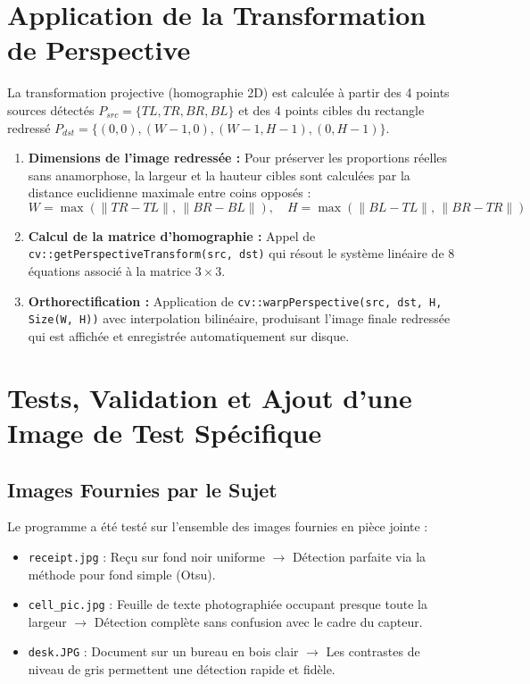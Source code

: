 \documentclass[a4paper,11pt]{article}
\begin{document}
\section{Application de la Transformation de Perspective}

La transformation projective (homographie 2D) est calculée à partir des 4 points sources détectés $P_{src} = \{TL, TR, BR, BL\}$ et des 4 points cibles du rectangle redressé $P_{dst} = \{(0,0), (W-1,0), (W-1,H-1), (0,H-1)\}$.

\begin{enumerate}
    \item \textbf{Dimensions de l'image redressée :} Pour préserver les proportions réelles sans anamorphose, la largeur et la hauteur cibles sont calculées par la distance euclidienne maximale entre coins opposés :
    \begin{equation}
        W = \max\left(\|TR - TL\|, \, \|BR - BL\|\right), \quad
        H = \max\left(\|BL - TL\|, \, \|BR - TR\|\right)
    \end{equation}
    \item \textbf{Calcul de la matrice d'homographie :} Appel de \texttt{cv::getPerspectiveTransform(src, dst)} qui résout le système linéaire de 8 équations associé à la matrice $3 \times 3$.
    \item \textbf{Orthorectification :} Application de \texttt{cv::warpPerspective(src, dst, H, Size(W, H))} avec interpolation bilinéaire, produisant l'image finale redressée qui est affichée et enregistrée automatiquement sur disque.
\end{enumerate}

\section{Tests, Validation et Ajout d'une Image de Test Spécifique}

\subsection{Images Fournies par le Sujet}
Le programme a été testé sur l'ensemble des images fournies en pièce jointe :
\begin{itemize}
    \item \texttt{receipt.jpg} : Reçu sur fond noir uniforme $\to$ Détection parfaite via la méthode pour fond simple (Otsu).
    \item \texttt{cell\_pic.jpg} : Feuille de texte photographiée occupant presque toute la largeur $\to$ Détection complète sans confusion avec le cadre du capteur.
    \item \texttt{desk.JPG} : Document sur un bureau en bois clair $\to$ Les contrastes de niveau de gris permettent une détection rapide et fidèle.
\end{itemize}
\end{document}
